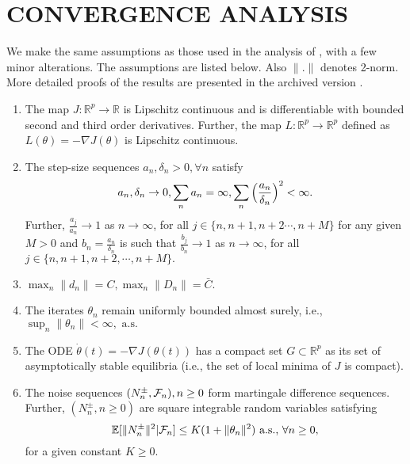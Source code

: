 \section{CONVERGENCE ANALYSIS}
\label{sec:convergenceresults}
We make the same assumptions as those used in the analysis of \cite{spall}, with a 
few minor alterations. The assumptions are listed below. Also $\|.\|$ denotes 2-norm. 
More detailed proofs of the results are presented in the archived version \cite{2017arXiv170206250K}.
\begin{enumerate}[label= \textbf{(A\arabic*)}]
 \item The map $J:\mathbb{R}^p \rightarrow \mathbb{R}$ is Lipschitz continuous and 
 is differentiable with bounded second and third order derivatives. Further, 
 the map $L:\mathbb{R}^p \rightarrow \mathbb{R}^p$ defined as 
 $L(\theta)=-\nabla J(\theta)$ is Lipschitz continuous.
 \item The step-size sequences $a_n, \delta_n >0, \forall n $  satisfy
 \begin{equation*}\label{stepsizes}
 a_n,\delta_n \rightarrow 0 , \sum_na_n=\infty,
 \sum_n \Big{(}\frac{a_n}{\delta_n}\Big{)}^2<\infty.
 \end{equation*}
 Further, $\frac{a_j}{a_n}\rightarrow 1$ as $n\rightarrow \infty$, for all
 $j \in \{n,n+1,n+2\cdots,n+M\}$ for any given $M>0$ and $b_n=\frac{a_n}{\delta_n}$ is 
 such that $\frac{b_j}{b_n}\rightarrow 1$ as $n\rightarrow \infty$, for all
 $j \in \{n,n+1,n+2,\cdots,n+M\}.$

 \item $\max_n \|d_n\|= C, \max_n \|D_n\|= \bar{C}$. 
 
 \item The iterates $\theta_n$ remain uniformly bounded almost surely, i.e.,
 $ \sup_n\|\theta_n\|<\infty, \text{ a.s.}$

 \item The ODE $\dot{\theta}(t)=-\nabla J(\theta(t))$ has a compact set 
 $G \subset \mathbb{R}^p$ as its set of asymptotically stable equilibria
 (i.e., the set of local minima of $J$ is compact).
 
 
 \item The noise sequences $(N_{n}^{\pm},\mathcal{F}_n), n\geq0 $ form martingale difference sequences.
 Further, $(N_{n}^{\pm} ,n\geq0)$ are square integrable random variables satisfying
 $$\mathbb{E}[\|N_{n}^{\pm}\|^2|\mathcal{F}_n]\leq K(1+\|\theta_n\|^2) \text{ a.s., } \forall n\geq0,$$
 for a given constant $K \geq 0.$
 
\end{enumerate}

